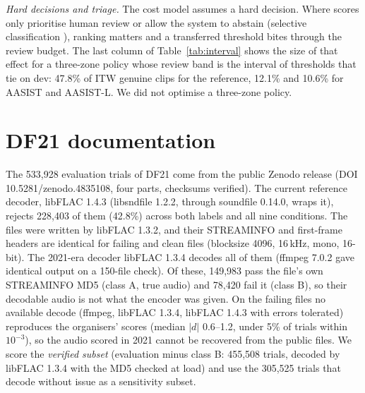 \documentclass[10pt]{article}
\newcommand{\tauE}{\tau^{*}_{\mathrm{EER}}}
\begin{document}
\begin{table}[!ht]
\caption{The registered cost check at \(\tauE\): normalised cost at the transferred threshold, the cost of the target-oracle threshold (discrimination) and the remainder (transfer).}
\label{tab:costsplit}
\centering
\footnotesize

\end{table}

\begin{table}[!ht]
\caption{Stability of the model with the largest gap, over 1,000 paired speaker-bootstrap replicates.}
\label{tab:stab}
\centering
\footnotesize

\end{table}

\emph{Hard decisions and triage.} The cost model assumes a hard decision. Where scores only prioritise human review or allow the system to abstain
(selective classification \cite{geifman17_selective}), ranking matters and a transferred threshold bites through the review budget. The last
column of Table~\ref{tab:interval} shows the size of that effect for a three-zone policy whose review band is the interval of thresholds that
tie on dev: 47.8\% of ITW genuine clips for the reference, 12.1\% and 10.6\% for AASIST and AASIST-L. We did not optimise a three-zone policy.

\section{DF21 documentation}
The 533,928 evaluation trials of DF21 come from the public Zenodo release (DOI 10.5281/zenodo.4835108, four parts, checksums verified). The
current reference decoder, libFLAC 1.4.3 (libsndfile 1.2.2, through soundfile 0.14.0, wraps it), rejects 228,403 of them (42.8\%) across both
labels and all nine conditions. The files were written by libFLAC 1.3.2, and their STREAMINFO and first-frame headers are identical for failing
and clean files (blocksize 4096, 16\,kHz, mono, 16-bit). The 2021-era decoder libFLAC 1.3.4 decodes all of them (ffmpeg 7.0.2 gave identical
output on a 150-file check). Of these, 149,983 pass the file's own STREAMINFO MD5 (class A, true audio) and 78,420 fail it (class B), so their
decodable audio is not what the encoder was given. On the failing files no available decode (ffmpeg, libFLAC 1.3.4, libFLAC 1.4.3 with errors tolerated) reproduces the
organisers' scores (median \(|d|\) 0.6--1.2, under 5\% of trials within \(10^{-3}\)), so the audio scored in 2021 cannot be recovered from the
public files. We score the \emph{verified subset} (evaluation minus class B: 455,508 trials, decoded by libFLAC 1.3.4 with the MD5 checked at
load) and use the 305,525 trials that decode without issue as a sensitivity subset.
\end{document}
